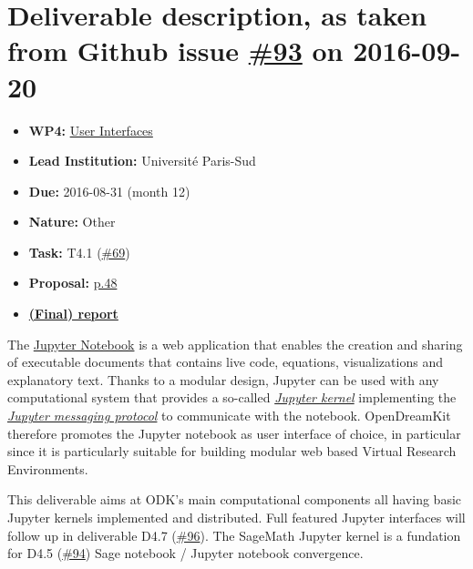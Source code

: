 \section*{\texorpdfstring{Deliverable description, as taken from Github
issue
\href{https://github.com/OpenDreamKit/OpenDreamKit/issues/93}{\#93} on
2016-09-20}{Deliverable description, as taken from Github issue \#93 on 2016-09-20}}\label{deliverable-description-as-taken-from-github-issue-93-on-2016-09-20}

\begin{itemize}
\tightlist
\item
  \textbf{WP4:}
  \href{https://github.com/OpenDreamKit/OpenDreamKit/tree/master/WP4}{User
  Interfaces}
\item
  \textbf{Lead Institution:} Université Paris-Sud
\item
  \textbf{Due:} 2016-08-31 (month 12)
\item
  \textbf{Nature:} Other
\item
  \textbf{Task:} T4.1
  (\href{https://github.com/OpenDreamKit/OpenDreamKit/issues/69}{\#69})
\item
  \textbf{Proposal:}
  \href{https://github.com/OpenDreamKit/OpenDreamKit/raw/master/Proposal/proposal-www.pdf}{p.48}
\item
  \textbf{\href{https://github.com/OpenDreamKit/OpenDreamKit/raw/master/WP4/D4.4/report-final.pdf}{(Final)
  report}}
\end{itemize}

The \href{https://jupyter.org}{Jupyter Notebook} is a web application
that enables the creation and sharing of executable documents that
contains live code, equations, visualizations and explanatory text.
Thanks to a modular design, Jupyter can be used with any computational
system that provides a so-called
\href{https://jupyter.readthedocs.io/en/latest/projects/kernels.html}{\emph{Jupyter
kernel}} implementing the
\href{https://jupyter-client.readthedocs.io/en/latest/}{\emph{Jupyter
messaging protocol}} to communicate with the notebook. OpenDreamKit
therefore promotes the Jupyter notebook as user interface of choice, in
particular since it is particularly suitable for building modular web
based Virtual Research Environments.

This deliverable aims at ODK's main computational components all having
basic Jupyter kernels implemented and distributed. Full featured Jupyter
interfaces will follow up in deliverable D4.7
(\href{https://github.com/OpenDreamKit/OpenDreamKit/issues/96}{\#96}).
The SageMath Jupyter kernel is a fundation for D4.5
(\href{https://github.com/OpenDreamKit/OpenDreamKit/issues/94}{\#94})
Sage notebook / Jupyter notebook convergence.

